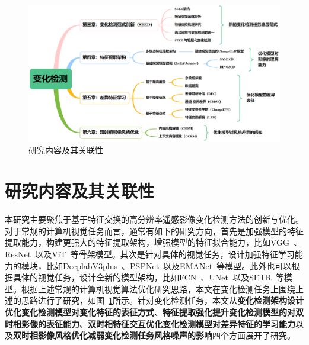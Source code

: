 \begin{figure}[!htbp]
  \centering
  \includegraphics[width=\textwidth]{paper_figures/绪论/研究内容关联.png}
  \caption{研究内容及其关联性}
  \label{fig:research_content}
\end{figure}


\section{研究内容及其关联性}
本研究主要聚焦于基于特征交换的高分辨率遥感影像变化检测方法的创新与优化。对于常规的计算机视觉任务而言，通常有如下的研究方向，首先是加强模型的特征提取能力，构建更强大的特征提取架构，增强模型的特征拟合能力，比如VGG~\cite{Simonyan2014VeryDC}、ResNet~\cite{He2015DeepRL}以及ViT~\cite{Dosovitskiy2020AnII}等骨架模型。其次是针对具体的视觉任务，设计加强特征学习能力的模块，比如DeeplabV3plus~\cite{chen2018encoder}、PSPNet~\cite{Zhao2016PyramidSP}以及EMANet~\cite{Li2019ExpectationMaximizationAN}等模型。此外也可以根据具体的视觉任务，设计全新的模型架构，比如FCN~\cite{Shelhamer2014FullyCN}、UNet~\cite{Ronneberger2015UNetCN}以及SETR~\cite{Zheng2020RethinkingSS}等模型。根据上述常规的计算机视觉算法优化研究思路，本文在变化检测任务上围绕上述的思路进行了研究，如图~\ref{fig:research_content}所示。针对变化检测任务，本文从\textbf{变化检测架构设计优化变化检测模型对变化特征的表征方式}、\textbf{特征提取强化提升变化检测模型的对双时相影像的表征能力}、\textbf{双时相特征交互优化变化检测模型对差异特征的学习能力}以及\textbf{双时相影像风格优化减弱变化检测任务风格噪声的影响}四个方面展开了研究。

